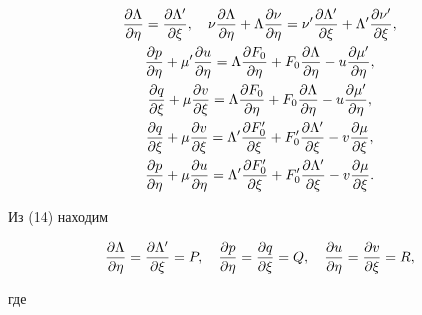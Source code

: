 \begin{gather} 


\myfrac{\Lambda}{\eta}=\myfrac{\Lambda'}{\xi},\quad 


\nu\myfrac{\Lambda}{\eta}+\Lambda\myfrac{\nu}{\eta}= 


\nu'\myfrac{\Lambda'}{\xi}+\Lambda'\myfrac{\nu'}{\xi},\notag \\ 


% 


\myfrac{p}{\eta}+\mu'\myfrac{u}{\eta}=\Lambda\myfrac{F_0}{\eta}+ 


F_0\myfrac{\Lambda}{\eta}-u\myfrac{\mu'}{\eta},\notag \\ 


% 


\myfrac{q}{\xi}+\mu\myfrac{v}{\xi}=\Lambda\myfrac{F_0}{\eta}+ 


F_0\myfrac{\Lambda}{\eta}-u\myfrac{\mu'}{\eta}, \\ 


% 


\myfrac{q}{\xi}+\mu\myfrac{v}{\xi}=\Lambda'\myfrac{F'_0}{\xi}+ 


F'_0\myfrac{\Lambda'}{\xi}-v\myfrac{\mu}{\xi},\notag \\ 


% 


\myfrac{p}{\eta}+\mu\myfrac{u}{\eta}=\Lambda' 


\myfrac{F'_0}{\xi}+F'_0\myfrac{\Lambda'}{\xi}- 


v\myfrac{\mu}{\xi}.\notag 


\end{gather} 


Из (14) находим 


\begin{equation} 


\myfrac{\Lambda}{\eta}=\myfrac{\Lambda'}{\xi}=P,\quad 


\myfrac{p}{\eta}=\myfrac{q}{\xi}=Q,\quad 


\myfrac{u}{\eta}=\myfrac{v}{\xi}=R, 


\end{equation} 


где 


